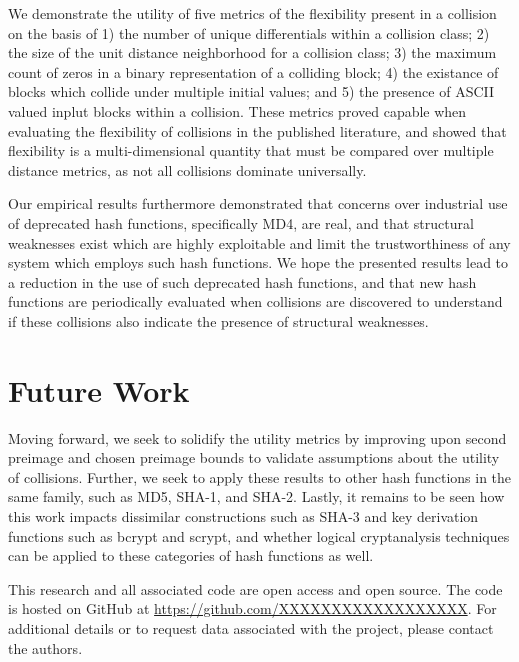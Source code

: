 \documentclass[conference]{IEEEtran}
\begin{document}
We demonstrate the utility of five metrics of the flexibility present
in a collision on the basis of 1) the number of unique differentials
within a collision class; 2) the size of the unit distance
neighborhood for a collision class; 3) the maximum count of zeros in a
binary representation of a colliding block; 4) the existance of blocks
which collide under multiple initial values; and 5) the presence of
ASCII valued inplut blocks within a collision.  These metrics proved
capable when evaluating the flexibility of collisions in the published
literature, and showed that flexibility is a multi-dimensional
quantity that must be compared over multiple distance metrics, as not all
collisions dominate universally.

Our empirical results furthermore demonstrated that concerns over
industrial use of deprecated hash functions, specifically MD4, are
real, and that structural weaknesses exist which are highly
exploitable and limit the trustworthiness of any system which employs
such hash functions.  We hope the presented results lead to a
reduction in the use of such deprecated hash functions, and that new
hash functions are periodically evaluated when collisions are
discovered to understand if these collisions also indicate the
presence of structural weaknesses.

\section{Future Work} \label{Sec:Future}

Moving forward, we seek to solidify the utility metrics by improving upon
second preimage and chosen preimage bounds to validate assumptions about the
utility of collisions. Further, we seek to apply these results to other hash
functions in the same family, such as MD5, SHA-1, and SHA-2. Lastly, it
remains to be seen how this work impacts dissimilar constructions such as
SHA-3 and key derivation functions such as bcrypt and scrypt, and whether
logical cryptanalysis techniques can be applied to these categories of
hash functions as well.

This research and all associated code are open access and open source.
The code is hosted on GitHub at \url{https://github.com/XXXXXXXXXXXXXXXXXX}.
For additional details or to request data associated with the project, please
contact the authors.




\end{document}
